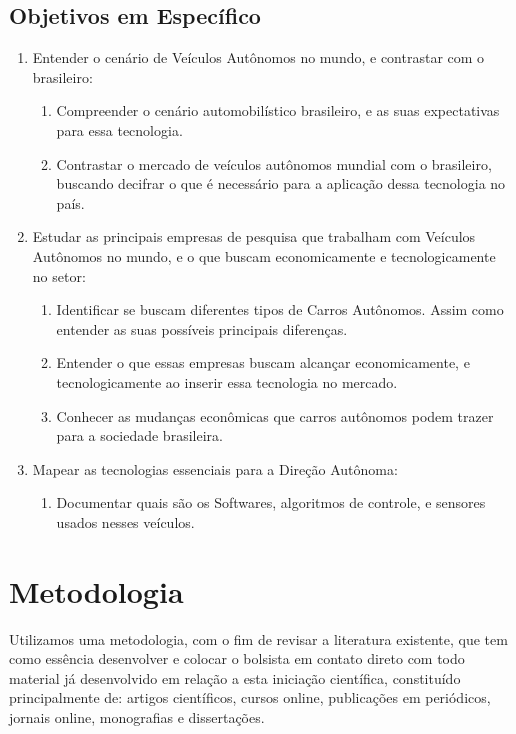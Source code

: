 \section{Objetivos em Específico}\label{Objetivos Específicos}
\begin{enumerate}
    \item  Entender o cenário de Veículos Autônomos no mundo, e contrastar com o brasileiro:
    \begin{enumerate}
        \item Compreender o cenário automobilístico brasileiro, e as suas expectativas para essa tecnologia.
        \item Contrastar o mercado de veículos autônomos mundial com o brasileiro, buscando  decifrar o que é necessário para a aplicação dessa tecnologia no país.
    \end{enumerate}
    \item  Estudar as principais empresas de pesquisa que trabalham com Veículos Autônomos no mundo, e o que buscam economicamente e tecnologicamente no setor:
    \begin{enumerate}
        \item Identificar se buscam diferentes tipos de Carros Autônomos. Assim como entender as suas possíveis principais diferenças.
        \item Entender o que essas empresas buscam alcançar economicamente, e tecnologicamente ao inserir essa tecnologia no mercado.
        \item Conhecer as mudanças econômicas que carros autônomos podem trazer para a sociedade brasileira. 
    \end{enumerate}
    \item Mapear as tecnologias essenciais para a Direção Autônoma:
    \begin{enumerate}
        \item Documentar quais são os Softwares, algoritmos de controle, e sensores usados nesses veículos.  
    \end{enumerate}
\end{enumerate}

\newpage
\chapter{Metodologia} \label{Metodologia}
Utilizamos uma metodologia, com o fim de revisar a literatura existente, que tem como essência desenvolver e colocar o bolsista em contato direto com todo material já desenvolvido em relação a esta iniciação científica, constituído principalmente de: artigos científicos, cursos online, publicações em periódicos, jornais online, monografias e dissertações.

